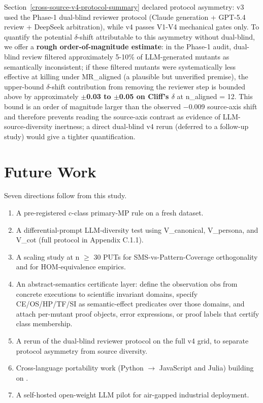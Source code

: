 \documentclass[manuscript,screen,review]{acmart}
\begin{document}
Section~\ref{cross-source-v4-protocol-summary} declared protocol asymmetry: v3 used the Phase-1 dual-blind
reviewer protocol (Claude generation + GPT-5.4 review + DeepSeek
arbitration), while v4 passes V1-V4 mechanical gates only. To quantify
the potential $\delta$-shift attributable to this asymmetry without dual-blind,
we offer a \textbf{rough order-of-magnitude estimate}: in the Phase-1
audit, dual-blind review filtered approximately 5-10\% of LLM-generated
mutants as semantically inconsistent; if these filtered mutants were
systematically less effective at killing under MR\_aligned (a plausible
but unverified premise), the upper-bound $\delta$-shift contribution from
removing the reviewer step is bounded above by approximately
\textbf{$\pm$0.03 to $\pm$0.05 on Cliff's $\delta$} at n\_aligned = 12. This bound is
an order of magnitude larger than the observed $-$0.009 source-axis shift
and therefore prevents reading the source-axis contrast as evidence of
LLM-source-diversity inertness; a direct dual-blind v4 rerun (deferred
to a follow-up study) would give a tighter quantification.


\section{Future Work}\label{future-work-and-p-series-roadmap}

Seven directions follow from this study.

\begin{enumerate}
\item
  A pre-registered c-class primary-MP rule on a fresh dataset.
\item
  A differential-prompt LLM-diversity test using V\_canonical,
  V\_persona, and V\_cot (full protocol in Appendix C.1.1).
\item
  A scaling study at n $\geq$ 30 PUTs for SMS-vs-Pattern-Coverage
  orthogonality and for HOM-equivalence empirics.
\item
  An abstract-semantics certificate layer: define the observation
  $\mathrm{obs}$ from concrete executions to scientific invariant domains,
  specify CE/OS/HP/TF/SI as semantic-effect predicates over those
  domains, and attach per-mutant proof objects, error expressions, or
  proof labels that certify class membership.
\item
  A rerun of the dual-blind reviewer protocol on the full v4 grid, to
  separate protocol asymmetry from source diversity.
\item
  Cross-language portability work (Python $\to$ JavaScript and Julia)
  building on \citet{tip2025llmorpheus}.
\item
  A self-hosted open-weight LLM pilot for air-gapped industrial
  deployment.
\end{enumerate}
\end{document}
